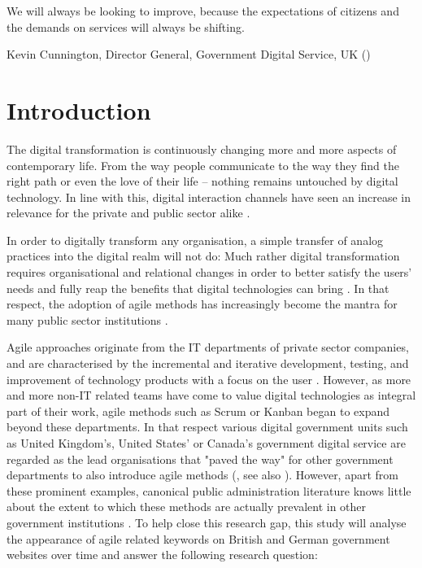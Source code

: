 
\setlength{\epigraphwidth}{0.5\textwidth}
\epigraph{We will always be looking to improve, because the expectations of citizens and the demands on services will always be shifting.}{Kevin Cunnington, Director General, Government Digital Service, UK (\cite*{Cunnington2017})}

\section{Introduction}
\label{Introduction}
The digital transformation is continuously changing more and more aspects of contemporary life. From the way people communicate to the way they find the right path or even the love of their life – nothing remains untouched by digital technology. In line with this, digital interaction channels have seen an increase in relevance for the private and public sector alike \parencite{Macaya2019}.

In order to digitally transform any organisation, a simple transfer of analog practices into the digital realm will not do: Much rather digital transformation requires organisational and relational changes in order to better satisfy the users' needs and fully reap the benefits that digital technologies can bring \parencite{Mergel2019a}. In that respect, the adoption of agile methods has increasingly become the mantra for many public sector institutions \parencite{Lundqvist2016, Vacari2015, Mergel}.

Agile approaches originate from the IT departments of private sector companies, and are characterised by the incremental and iterative development, testing, and improvement of technology products with a focus on the user \parencite{Mergel2016}. However, as more and more non-IT related teams have come to value digital technologies as integral part of their work, agile methods such as Scrum or Kanban began to expand beyond these departments. In that respect various digital government units such as United Kingdom's, United States' or Canada's government digital service are regarded as the lead organisations that "paved the way" for other government departments to also introduce agile methods (\cite[2]{Mergel}, see also \cite{Clarke2019}). However, apart from these prominent examples, canonical public administration literature knows little about the extent to which these methods are actually prevalent in other government institutions \parencite{CarvalhoFernandes2016, Vacari2015, Mergel2018, Mergel}. To help close this research gap, this study will analyse the appearance of agile related keywords on British and German government websites over time and answer the following research question:

